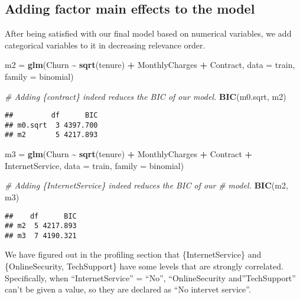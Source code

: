 \documentclass[
]{article}
\newenvironment{Shaded}{\begin{snugshade}}{\end{snugshade}}
\newcommand{\AttributeTok}[1]{\textcolor[rgb]{0.13,0.29,0.53}{#1}}
\newcommand{\CommentTok}[1]{\textcolor[rgb]{0.56,0.35,0.01}{\textit{#1}}}
\newcommand{\FunctionTok}[1]{\textcolor[rgb]{0.13,0.29,0.53}{\textbf{#1}}}
\newcommand{\NormalTok}[1]{#1}
\newcommand{\OtherTok}[1]{\textcolor[rgb]{0.56,0.35,0.01}{#1}}
\newcommand{\SpecialCharTok}[1]{\textcolor[rgb]{0.81,0.36,0.00}{\textbf{#1}}}
\begin{document}
\hypertarget{adding-factor-main-effects-to-the-model}{%
\subsection{Adding factor main effects to the
model}\label{adding-factor-main-effects-to-the-model}}

After being satisfied with our final model based on numerical variables,
we add categorical variables to it in decreasing relevance order.

\begin{Shaded}
\begin{Highlighting}[]
\NormalTok{m2 }\OtherTok{=} \FunctionTok{glm}\NormalTok{(Churn }\SpecialCharTok{\textasciitilde{}} \FunctionTok{sqrt}\NormalTok{(tenure) }\SpecialCharTok{+}\NormalTok{ MonthlyCharges }\SpecialCharTok{+}\NormalTok{ Contract, }\AttributeTok{data =}\NormalTok{ train,}
    \AttributeTok{family =}\NormalTok{ binomial)}

\CommentTok{\# Adding \{contract\} indeed reduces the BIC of our model.}
\FunctionTok{BIC}\NormalTok{(m0.sqrt, m2)}
\end{Highlighting}
\end{Shaded}

\begin{verbatim}
##         df      BIC
## m0.sqrt  3 4397.700
## m2       5 4217.893
\end{verbatim}

\begin{Shaded}
\begin{Highlighting}[]
\NormalTok{m3 }\OtherTok{=} \FunctionTok{glm}\NormalTok{(Churn }\SpecialCharTok{\textasciitilde{}} \FunctionTok{sqrt}\NormalTok{(tenure) }\SpecialCharTok{+}\NormalTok{ MonthlyCharges }\SpecialCharTok{+}\NormalTok{ Contract }\SpecialCharTok{+}\NormalTok{ InternetService,}
    \AttributeTok{data =}\NormalTok{ train, }\AttributeTok{family =}\NormalTok{ binomial)}

\CommentTok{\# Adding \{InternetService\} indeed reduces the BIC of our}
\CommentTok{\# model.}
\FunctionTok{BIC}\NormalTok{(m2, m3)}
\end{Highlighting}
\end{Shaded}

\begin{verbatim}
##    df      BIC
## m2  5 4217.893
## m3  7 4190.321
\end{verbatim}

We have figured out in the profiling section that \{InternetService\}
and \{OnlineSecurity, TechSupport\} have some levels that are strongly
correlated. Specifically, when ``InternetService'' = ``No'',
``OnlineSecurity and''TechSupport'' can't be given a value, so they are
declared as ``No intervet service''.
\end{document}
